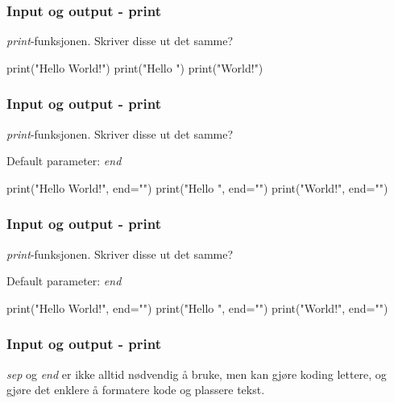 \begin{frame}[fragile]
    \frametitle{Input og output - print}

    \textit{print}-funksjonen. Skriver disse ut det samme? 

\begin{python}
print("Hello World!")
print("Hello ")
print("World!")
\end{python}

\end{frame}

\begin{frame}[fragile]
    \frametitle{Input og output - print}

    \textit{print}-funksjonen. Skriver disse ut det samme? 

    Default parameter: \textit{end}

\begin{python}
print("Hello World!", end="\n")
print("Hello ", end="\n")
print("World!", end="\n")
\end{python}

\end{frame}

\begin{frame}[fragile]
    \frametitle{Input og output - print}

    \textit{print}-funksjonen. Skriver disse ut det samme? 

    Default parameter: \textit{end}

\begin{python}
print("Hello World!", end="\n")
print("Hello ", end="")
print("World!", end="\n")
\end{python}

\end{frame}

\begin{frame}[fragile]
    \frametitle{Input og output - print}

    \textit{sep} og \textit{end} er ikke alltid nødvendig å bruke, men kan gjøre koding lettere, og gjøre det enklere å formatere kode og plassere tekst. 

\end{frame}
